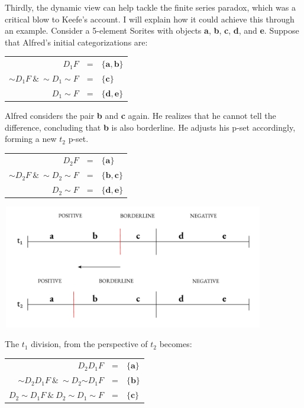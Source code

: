 Thirdly, the dynamic view can help tackle the finite series paradox,
which was a critical blow to Keefe's account. I will explain how it
could achieve this through an example. Consider a 5-element Sorites with
objects \textbf{a}, \textbf{b}, \textbf{c}, \textbf{d}, and \textbf{e}.
Suppose that Alfred's initial categorizations are:

\begin{center}
\begin{tabulary}{\textwidth}{RCL}
$D_1 F$ & = & $\{ \mathbf{a}, \mathbf{b} \}$ \\
${\sim}D_1 F \ \& \ {\sim}D_1{\sim}F$ & = & $\{ \mathbf{c} \}$ \\
$D_{1}{\sim}F$ & = & $\{ \mathbf{d}, \mathbf{e}\}$ \\
\end{tabulary}
\end{center}
Alfred considers the pair \textbf{b} and \textbf{c} again. He realizes
that he cannot tell the difference, concluding that \textbf{b} is also
borderline. He adjusts his p-set accordingly, forming a new \(t_{2}\)
p-set.

\begin{center}
\begin{tabulary}{\textwidth}{RCL}
$D_2 F$ & = & $\{ \mathbf{a} \}$ \\
${\sim} D_2 F \ \& \ {\sim}D_2 {\sim}F$ & = & $\{ \mathbf{b}, \mathbf{c} \}$ \\
$D_2 {\sim}F$ & = & $\{ \mathbf{d}, \mathbf{e} \}$
\end{tabulary}
\end{center}

\begin{center}
\includegraphics[width=4.50937in,height=2.12793in]{papers/figures/2-3.pdf}
 \end{center}
The \(t_{1}\) division, from the perspective of \(t_{2}\) becomes:

\begin{center}
\begin{tabulary}{\textwidth}{RCL}
$D_2 D_1 F$ & = & $\{ \mathbf{a} \}$ \\
${\sim} D_2 D_1 F \ \& \ {\sim}D_{2}{{\sim}D}_{1}F$ & = & $\{ \mathbf{b} \}$ \\
$D_{2}{\sim}D_{1}F\ \&\ D_{2}{\sim}D_{1}{\sim}F $ & = & $\{ \mathbf{c} \}$
\end{tabulary}
\end{center}

